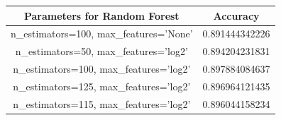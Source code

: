 \documentclass{article}
\begin{document}
\begin{table}[ht]
\centering 
\begin{tabular}{c c } 
\hline 
Parameters for Random Forest & Accuracy\\ [0.5ex] 
\hline 
n\_estimators=100, max\_features='None' & 0.891444342226\\ 
n\_estimators=50, max\_features='log2' & 0.894204231831\\
n\_estimators=100, max\_features='log2' & 0.897884084637\\
n\_estimators=125, max\_features='log2' & 0.896964121435\\
n\_estimators=115, max\_features='log2' & 0.896044158234\\ [1ex] 
\hline 
\end{tabular}
\label{table:nonlin} 
\end{table}
\end{document}
